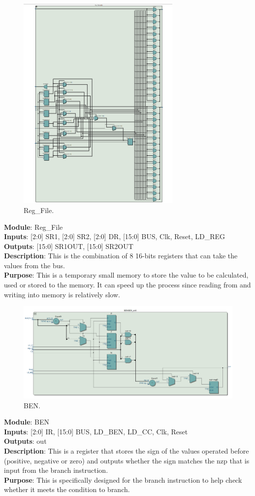\documentclass[12pt]{article}
\begin{document}
\begin{figure}[H]
    \centering
    \includegraphics[width=8cm]{regfiles.png}
    \caption{Reg\_File.}
\end{figure}
\textbf{Module}: Reg\_File \\ 
\textbf{Inputs}: [2:0] SR1, [2:0] SR2, [2:0] DR, [15:0] BUS, Clk, Reset, LD\_REG\\ 
\textbf{Outputs}: [15:0] SR1OUT, [15:0] SR2OUT\\ 
\textbf{Description}: This is the combination of 8 16-bits registers that can take the values from the bus. \\ 
\textbf{Purpose}: This is a temporary small memory to store the value to be calculated, used or stored to the memory. It can speed up the process since reading from and writing into memory is relatively slow. \\

\begin{figure}[H]
    \centering
    \includegraphics[width=15cm]{ben.png}
    \caption{BEN.}
\end{figure}
\textbf{Module}: BEN \\ 
\textbf{Inputs}: [2:0] IR, [15:0] BUS, LD\_BEN, LD\_CC, Clk, Reset\\ 
\textbf{Outputs}: out \\ 
\textbf{Description}: This is a register that stores the sign of the values operated before (positive, negative or zero) and outputs whether the sign matches the nzp that is input from the branch instruction. \\
\textbf{Purpose}: This is specifically designed for the branch instruction to help check whether it meets the condition to branch. \\
\end{document}
